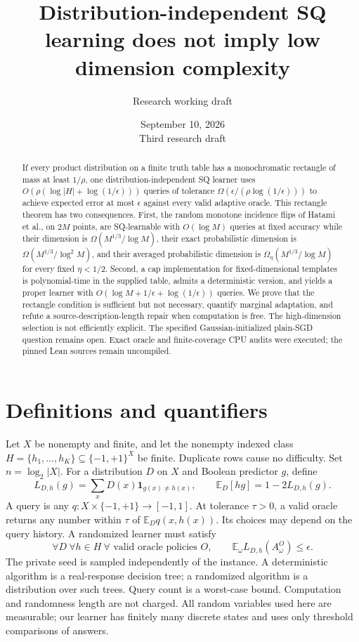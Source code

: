 \documentclass[11pt]{article}
\title{Distribution-independent SQ learning does not imply low dimension complexity}
\author{Research working draft}
\date{September 10, 2026\\Third research draft}
\newcommand{\E}{\mathbb E}
\newcommand{\1}{\mathbf 1}
\begin{document}
\maketitle
\begin{abstract}
If every product distribution on a finite truth table has a monochromatic rectangle of mass at least $1/\rho$, one distribution-independent SQ learner uses $O(\rho(\log|H|+\log(1/\epsilon)))$ queries of tolerance $\Omega(\epsilon/(\rho\log(1/\epsilon)))$ to achieve expected error at most $\epsilon$ against every valid adaptive oracle. This rectangle theorem has two consequences. First, the random monotone incidence flips of Hatami et al., on $2M$ points, are SQ-learnable with $O(\log M)$ queries at fixed accuracy while their dimension is $\Omega(M^{1/3}/\log M)$, their exact probabilistic dimension is $\Omega(M^{1/3}/\log^2M)$, and their averaged probabilistic dimension is $\Omega_\eta(M^{1/3}/\log M)$ for every fixed $\eta<1/2$. Second, a cap implementation for fixed-dimensional templates is polynomial-time in the supplied table, admits a deterministic version, and yields a proper learner with $O(\log M+1/\epsilon+\log(1/\epsilon))$ queries. We prove that the rectangle condition is sufficient but not necessary, quantify marginal adaptation, and refute a source-description-length repair when computation is free. The high-dimension selection is not efficiently explicit. The specified Gaussian-initialized plain-SGD question remains open. Exact oracle and finite-coverage CPU audits were executed; the pinned Lean sources remain uncompiled.
\end{abstract}

\section{Definitions and quantifiers}
Let $X$ be nonempty and finite, and let the nonempty indexed class $H=\{h_1,\ldots,h_K\}\subseteq\{-1,+1\}^X$ be finite. Duplicate rows cause no difficulty. Set $n=\log_2|X|$. For a distribution $D$ on $X$ and Boolean predictor $g$, define
\[
 L_{D,h}(g)=\sum_xD(x)\1_{g(x)\ne h(x)},\qquad
 \E_D[hg]=1-2L_{D,h}(g).
\]
A query is any $q:X\times\{-1,+1\}\to[-1,1]$. At tolerance $\tau>0$, a valid oracle returns any number within $\tau$ of $\E_D q(x,h(x))$. Its choices may depend on the query history. A randomized learner must satisfy
\begin{equation}\label{eq:guarantee}
 \forall D\ \forall h\in H\ \forall\text{ valid oracle policies }O,
 \qquad \E_\omega L_{D,h}(A^O_\omega)\le\epsilon.
\end{equation}
The private seed is sampled independently of the instance. A deterministic algorithm is a real-response decision tree; a randomized algorithm is a distribution over such trees. Query count is a worst-case bound. Computation and randomness length are not charged. All random variables used here are measurable; our learner has finitely many discrete states and uses only threshold comparisons of answers.
\end{document}
